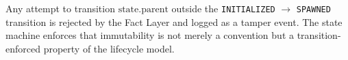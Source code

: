 Any attempt to transition $\text{state}.\text{parent}$ outside the \texttt{INITIALIZED} $\to$ \texttt{SPAWNED} transition is rejected by the Fact Layer and logged as a tamper event. The state machine enforces that immutability is not merely a convention but a transition-enforced property of the lifecycle model.

